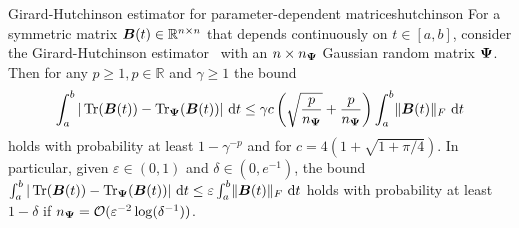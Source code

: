 
\begin{theorem}{Girard-Hutchinson estimator for parameter-dependent matrices}{hutchinson}
    For a symmetric matrix $\boldsymbol{B}(t) \in \mathbb{R}^{n \times n}$ that depends continuously on $t \in [a, b]$, consider the  Girard-Hutchinson estimator~ with an $n\times n_{\boldsymbol{\Psi}}$ Gaussian random matrix $\boldsymbol{\Psi}$. Then for any $p \geq 1, p \in \mathbb{R}$ and $\gamma \geq 1$ the bound 
    \begin{equation} \label{eq:ghbound}
        \int_{a}^{b} |\operatorname{Tr}(\boldsymbol{B}(t)) - \operatorname{Tr}_{\boldsymbol{\Psi}}(\boldsymbol{B}(t))|~\mathrm{d}t \leq \gamma c \left( \sqrt{\frac{p}{n_{\boldsymbol{\Psi}}}} + \frac{p}{n_{\boldsymbol{\Psi}}}  \right) \int_{a}^{b} \lVert \boldsymbol{B}(t) \rVert _F~\mathrm{d}t
    \end{equation}
    holds with probability at least $1 - \gamma^{-p}$ and for $c = 4 (1 + \sqrt{1 + \pi/4})$.
    In particular, given $\varepsilon \in (0, 1)$ and $\delta \in (0, e^{-1})$, the bound $\int_{a}^{b} | \operatorname{Tr}(\boldsymbol{B}(t)) - \operatorname{Tr}_{\boldsymbol{\Psi}}(\boldsymbol{B}(t)) | ~\mathrm{d}t \leq \varepsilon \int_{a}^{b} \lVert \boldsymbol{B}(t) \rVert _F~\mathrm{d}t$ holds 
    with probability at least $1-\delta$ if $n_{\boldsymbol{\Psi}} = \mathcal{O}(\varepsilon^{-2} \log(\delta^{-1}))$.
\end{theorem}

